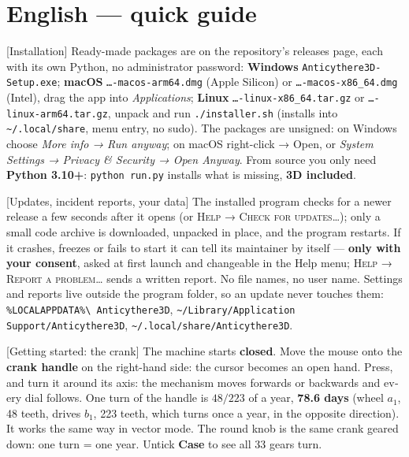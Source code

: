 \documentclass[a4paper,11pt]{article}
\begin{document}
\section*{English — quick guide}

\begin{english}[Installation]
Ready-made packages are on the repository's releases page, each with its own
Python, no administrator password: \textbf{Windows}
\texttt{Anticythere3D-Setup.exe}; \textbf{macOS} \texttt{…-macos-arm64.dmg}
(Apple Silicon) or \texttt{…-macos-x86\_64.dmg} (Intel), drag the app into
\emph{Applications}; \textbf{Linux} \texttt{…-linux-x86\_64.tar.gz} or
\texttt{…-linux-arm64.tar.gz}, unpack and run \texttt{./installer.sh}
(installs into \texttt{\textasciitilde/.local/share}, menu entry, no sudo).
The packages are unsigned: on Windows choose \emph{More info → Run anyway}; on
macOS right-click → Open, or \emph{System Settings → Privacy \& Security →
Open Anyway}. From source you only need \textbf{Python 3.10+}:
\texttt{python run.py} installs what is missing, \textbf{3D included}.
\end{english}

\begin{english}[Updates, incident reports, your data]
The installed program checks for a newer release a few seconds after it
opens (or \textsc{Help → Check for updates…}); only a small code archive is
downloaded, unpacked in place, and the program restarts. If it crashes,
freezes or fails to start it can tell its maintainer by itself —
\textbf{only with your consent}, asked at first launch and changeable in the
Help menu; \textsc{Help → Report a problem…} sends a written report. No file
names, no user name. Settings and reports live outside the program folder,
so an update never touches them: \texttt{\%LOCALAPPDATA\%\textbackslash
Anticythere3D}, \texttt{\textasciitilde/Library/Application
Support/Anticythere3D}, \texttt{\textasciitilde/.local/share/Anticythere3D}.
\end{english}

\begin{english}[Getting started: the crank]
The machine starts \textbf{closed}. Move the mouse onto the \textbf{crank
handle} on the right-hand side: the cursor becomes an open hand. Press, and
turn it around its axis: the mechanism moves forwards or backwards and every
dial follows. One turn of the handle is $48/223$ of a year,
\textbf{78.6 days} (wheel $a_1$, 48 teeth, drives $b_1$, 223 teeth, which turns
once a year, in the opposite direction). It works the same way in vector
mode. The round knob is the same crank geared down: one turn = one year.
Untick \textbf{Case} to see all 33 gears turn.
\end{english}
\end{document}
